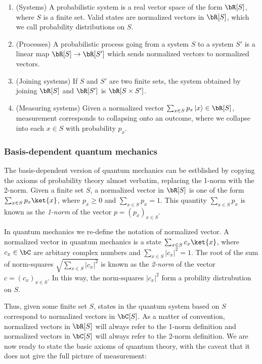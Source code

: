 \begin{defn} $\,$

\begin{enumerate}
\item (Systems) A probabilistic system is a real vector space of the form $\bR[S]$, where $S$ is a finite set. Valid states are normalized vectors in $\bR[S]$, which we call probability distributions on $S$.
\item (Processes) A probabilistic process going from a system $S$ to a system $S'$ is a linear map $\bR[S]\to \bR[S']$ which sends normalized vectors to normalized vectors.
\item (Joining systems) If $S$ and $S'$ are two finite sets, the system obtained by joining $\bR[S]$ and $\bR[S']$ is $\bR[S\times S']$.
\item (Measuring systems) Given a normalized vector $\sum_{x\in S}p_x \left |x\right>\in \bR[S]$, measurement corresponds to collapsing onto an outcome, where we collapse into each $x\in S$ with probability $p_x$.
\end{enumerate}
\end{defn}

\subsubsection{Basis-dependent quantum mechanics}

The basis-dependent version of quantum mechanics can be estblished by copying the axioms of probability theory almost verbatim, replacing the 1-norm with the 2-norm. Given a finite set $S$, a normalized vector in $\bR[S]$ is one of the form $\sum_{x\in S}p_x \ket{x}$, where $p_x\geq 0$ and $\sum_{x\in S}p_x=1$.  This quantity $\sum_{x\in S}p_x$ is known as the {\em 1-norm} of the vector $p=(p_x)_{x\in S}$.

In quantum mechanics we re-define the notation of normalized vector. A normalized vector in quantum mechanics is a state $\sum_{x\in S}c_x \ket{x}$, where $c_x\in \bC$ are arbitary complex numbers and $\sum_{x\in S}|c_x|^2=1$. The root of the sum of norm-squares $\sqrt{\sum_{x\in S}|c_x|^2}$ is known as the {\em 2-norm} of the vector $c=(c_x)_{x\in S}$. In this way, the norm-squares $|c_x|^2$ form a probility distrubution on $S$.

Thus, given some finite set $S$, states in the quantum system based on $S$ correspond to normalized vectors in $\bC[S]$. As a matter of convention, normalized vectors in $\bR[S]$ will always refer to the 1-norm definition and normalized vectors in $\bC[S]$ will always refer to the 2-norm definition. We are now ready to state the basic axioms of quantum theory, with the caveat that it does not give the full picture of measurement:

